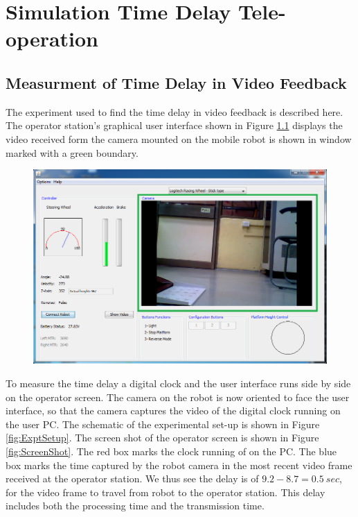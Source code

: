 \chapter{Simulation Time Delay Tele-operation }
\section{Measurment of Time Delay in Video Feedback}
\label{app:DH}
The experiment used to find the time delay in video feedback is described here. The operator station's graphical user interface shown in Figure \ref{fig:Gui2} displays the video received form the camera mounted on the mobile robot is shown in window marked with a green boundary.   
\begin{figure}
	\includegraphics[width=\linewidth,keepaspectratio]{Chapter5/fig/gui1}
	\label{fig:Gui2} 
\end{figure}

To measure the time delay a digital clock and the user interface runs side by side on the operator screen. The camera on the robot is now oriented to face the user interface, so that the camera captures the video of the digital clock running on the user PC. The schematic of the experimental set-up is shown in Figure \ref{fig:ExptSetup}. The screen shot of the operator screen is shown in Figure \ref{fig:ScreenShot}. The red box marks the clock running of on the PC. The blue box marks the time captured by the robot camera in the most recent video frame received at the operator station. We thus see the delay is of $9.2-8.7=0.5~sec$, for the video frame to travel from robot to the operator station. This delay includes both the processing time and the transmission time.

